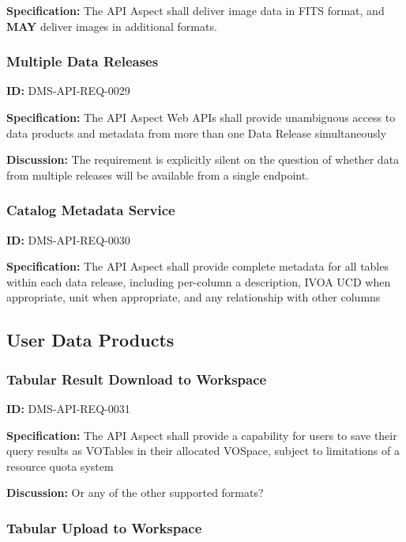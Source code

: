 \documentclass[SE,toc,lsstdraft]{lsstdoc}
\begin{document}
\textbf{Specification:}
The API Aspect shall deliver image data in FITS format, and \textbf{MAY} deliver images in additional formats.

\subsubsection{Multiple Data Releases}

\label{DMS-API-REQ-0029}
\textbf{ID:} DMS-API-REQ-0029

\textbf{Specification:}
The API Aspect Web APIs shall provide unambiguous access to data products and metadata from more than one Data Release simultaneously

\textbf{Discussion:}
The requirement is explicitly silent on the question of whether data from multiple releases will be available from a single endpoint.

\subsubsection{Catalog Metadata Service}

\label{DMS-API-REQ-0030}
\textbf{ID:} DMS-API-REQ-0030

\textbf{Specification:}
The API Aspect shall provide complete metadata for all tables within each data release, including per-column a description, IVOA UCD when appropriate, unit when appropriate, and any relationship with other columns

\subsection{User Data Products}

\subsubsection{Tabular Result Download to Workspace}

\label{DMS-API-REQ-0031}
\textbf{ID:} DMS-API-REQ-0031

\textbf{Specification:}
The API Aspect shall provide a capability for users to save their query results as VOTables in their allocated VOSpace, subject to limitations of a resource quota system

\textbf{Discussion:}
Or any of the other supported formats?

\subsubsection{Tabular Upload to Workspace}
\end{document}
